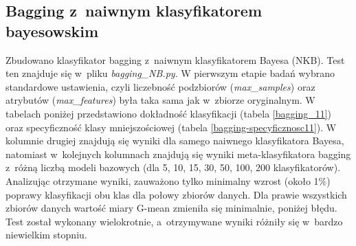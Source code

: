 \subsection{Bagging z~naiwnym klasyfikatorem bayesowskim}
Zbudowano klasyfikator bagging z~naiwnym klasyfikatorem Bayesa (NKB). Test ten znajduje się w~pliku \textit{bagging\_NB.py}. W pierwszym etapie badań wybrano standardowe ustawienia, czyli liczebność podzbiorów (\textit{max\_samples}) oraz atrybutów (\textit{max\_features}) była taka sama jak w~zbiorze oryginalnym.
W tabelach poniżej przedstawiono dokładność klasyfikacji (tabela \ref{bagging_11}) oraz specyficzność klasy mniejszościowej (tabela \ref{bagging-specyficznosc11}). W kolumnie drugiej znajdują się wyniki dla samego naiwnego klasyfikatora Bayesa, natomiast w~kolejnych kolumnach znajdują się wyniki meta-klasyfikatora bagging z~różną liczbą modeli bazowych (dla 5, 10, 15, 30, 50, 100, 200 klasyfikatorów). Analizując otrzymane wyniki, zauważono tylko minimalny wzrost (około 1\%) poprawy klasyfikacji obu klas dla połowy zbiorów danych. Dla prawie wszystkich zbiorów danych wartość miary G-mean zmieniła się minimalnie, poniżej błędu. Test został wykonany wielokrotnie, a~otrzymywane wyniki różniły się w~bardzo niewielkim stopniu. 
